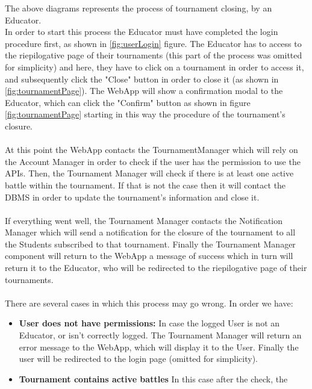\documentclass{article}
\begin{document}
{        The above diagrams represents the process of tournament closing, by an Educator. \\
        In order to start this process the Educator must have completed the login procedure
        first, as shown in \ref{fig:userLogin} figure.
        The Educator has to access to the riepilogative page of their tournaments 
        (this part of the process was omitted for simplicity) and here, they have to click 
        on a tournament in order to access it, and subsequently click the "Close" button
        in order to close it (as shown in \ref{fig:tournamentPage}).
        The WebApp will show a confirmation modal to the Educator, which can click the "Confirm"
        button as shown in figure \ref{fig:tournamentPage} starting in this way the procedure of 
        the tournament's closure. 
        \\ \\
        At this point the WebApp contacts the TournamentManager which will rely on the Account
        Manager in order to check if the user has the permission to use the APIs.
        Then, the Tournament Manager will check if there is at least one active battle within the
        tournament. If that is not the case then it will contact the DBMS in order to update the
        tournament's information and close it.
        \\ \\
        If everything went well, the Tournament Manager contacts the Notification
        Manager which will send a notification for the closure of the tournament to all the 
        Students subscribed to that tournament. 
        Finally the Tournament Manager component will return to the WebApp a message of success
        which in turn will return it to the Educator, who will be redirected to the 
        riepilogative page of their tournaments.
        \\ \\
        There are several cases in which this process may go wrong. In order we have:
        \begin{itemize}
            \item \textbf{User does not have permissions:} In case the logged User is not an
            Educator, or isn't correctly logged. The Tournament Manager will return an
            error message to the WebApp, which will display it to the User.
            Finally the user will be redirected to the login page (omitted for simplicity).
            \item \textbf{Tournament contains active battles} In this case after the check, the 

\end{itemize}}
\end{document}
